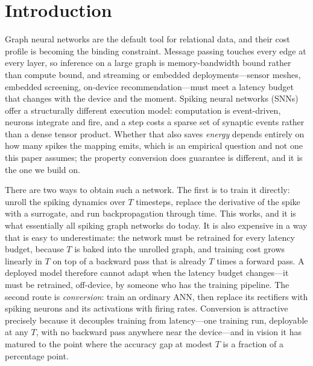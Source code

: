 \section{Introduction}
\label{sec:intro}

Graph neural networks are the default tool for relational data, and their cost profile is becoming
the binding constraint. Message passing touches every edge at every layer, so inference on a large
graph is memory-bandwidth bound rather than compute bound, and streaming or embedded
deployments---sensor meshes, embedded screening, on-device recommendation---must meet a latency
budget that changes with the device and the moment. Spiking neural networks (SNNs) offer a
structurally different execution model: computation is event-driven, neurons integrate and fire, and
a step costs a sparse set of synaptic events rather than a dense tensor product. Whether that also
saves \emph{energy} depends entirely on how many spikes the mapping emits, which is an empirical
question and not one this paper assumes; the property conversion does guarantee is different, and it
is the one we build on.

There are two ways to obtain such a network. The first is to train it directly: unroll the spiking
dynamics over $T$ timesteps, replace the derivative of the spike with a surrogate, and run
backpropagation through time. This works, and it is what essentially all spiking graph networks do
today. It is also expensive in a way that is easy to underestimate: the network must be retrained
for every latency budget, because $T$ is baked into the unrolled graph, and training cost grows
linearly in $T$ on top of a backward pass that is already $T$ times a forward pass. A deployed model
therefore cannot adapt when the latency budget changes---it must be retrained, off-device, by
someone who has the training pipeline. The second route is \emph{conversion}: train an ordinary ANN,
then replace its rectifiers with spiking neurons and its activations with firing rates. Conversion is
attractive precisely because it decouples training from latency---one training run, deployable at
any $T$, with no backward pass anywhere near the device---and in vision it has matured to the point
where the accuracy gap at modest $T$ is a fraction of a percentage point.

